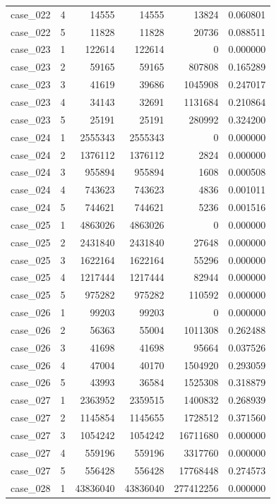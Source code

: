\begin{longtable}{lrrrrr}
case\_022 & 4 & 14555 & 14555 & 13824 & 0.060801 \\
case\_022 & 5 & 11828 & 11828 & 20736 & 0.088511 \\
case\_023 & 1 & 122614 & 122614 & 0 & 0.000000 \\
case\_023 & 2 & 59165 & 59165 & 807808 & 0.165289 \\
case\_023 & 3 & 41619 & 39686 & 1045908 & 0.247017 \\
case\_023 & 4 & 34143 & 32691 & 1131684 & 0.210864 \\
case\_023 & 5 & 25191 & 25191 & 280992 & 0.324200 \\
case\_024 & 1 & 2555343 & 2555343 & 0 & 0.000000 \\
case\_024 & 2 & 1376112 & 1376112 & 2824 & 0.000000 \\
case\_024 & 3 & 955894 & 955894 & 1608 & 0.000508 \\
case\_024 & 4 & 743623 & 743623 & 4836 & 0.001011 \\
case\_024 & 5 & 744621 & 744621 & 5236 & 0.001516 \\
case\_025 & 1 & 4863026 & 4863026 & 0 & 0.000000 \\
case\_025 & 2 & 2431840 & 2431840 & 27648 & 0.000000 \\
case\_025 & 3 & 1622164 & 1622164 & 55296 & 0.000000 \\
case\_025 & 4 & 1217444 & 1217444 & 82944 & 0.000000 \\
case\_025 & 5 & 975282 & 975282 & 110592 & 0.000000 \\
case\_026 & 1 & 99203 & 99203 & 0 & 0.000000 \\
case\_026 & 2 & 56363 & 55004 & 1011308 & 0.262488 \\
case\_026 & 3 & 41698 & 41698 & 95664 & 0.037526 \\
case\_026 & 4 & 47004 & 40170 & 1504920 & 0.293059 \\
case\_026 & 5 & 43993 & 36584 & 1525308 & 0.318879 \\
case\_027 & 1 & 2363952 & 2359515 & 1400832 & 0.268939 \\
case\_027 & 2 & 1145854 & 1145655 & 1728512 & 0.371560 \\
case\_027 & 3 & 1054242 & 1054242 & 16711680 & 0.000000 \\
case\_027 & 4 & 559196 & 559196 & 3317760 & 0.000000 \\
case\_027 & 5 & 556428 & 556428 & 17768448 & 0.274573 \\
case\_028 & 1 & 43836040 & 43836040 & 277412256 & 0.000000 \\

\end{longtable}
